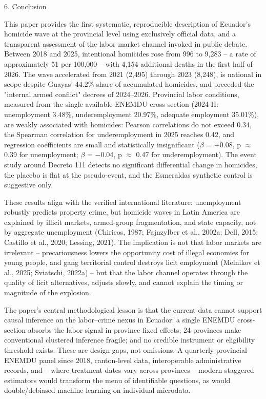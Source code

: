 6. Conclusion


This paper provides the first systematic, reproducible description of Ecuador's homicide wave at the provincial level using exclusively official data, and a transparent assessment of the labor market channel invoked in public debate. Between 2018 and 2025, intentional homicides rose from 996 to 9,283 -- a rate of approximately 51 per 100,000 -- with 4,154 additional deaths in the first half of 2026. The wave accelerated from 2021 (2,495) through 2023 (8,248), is national in scope despite Guayas' 44.2\% share of accumulated homicides, and preceded the "internal armed conflict" decrees of 2024--2026. Provincial labor conditions, measured from the single available ENEMDU cross-section (2024-II: unemployment 3.48\%, underemployment 20.97\%, adequate employment 35.01\%), are weakly associated with homicides: Pearson correlations do not exceed 0.34, the Spearman correlation for underemployment in 2025 reaches 0.42, and regression coefficients are small and statistically insignificant ($\beta$ = +0.08, p $\approx$ 0.39 for unemployment; $\beta$ = $-$0.04, p $\approx$ 0.47 for underemployment). The event study around Decreto 111 detects no significant differential change in homicides, the placebo is flat at the pseudo-event, and the Esmeraldas synthetic control is suggestive only.


These results align with the verified international literature: unemployment robustly predicts property crime, but homicide waves in Latin America are explained by illicit markets, armed-group fragmentation, and state capacity, not by aggregate unemployment (Chiricos, 1987; Fajnzylber et al., 2002a; Dell, 2015; Castillo et al., 2020; Lessing, 2021). The implication is not that labor markets are irrelevant -- precariousness lowers the opportunity cost of illegal economies for young people, and gang territorial control destroys licit employment (Melnikov et al., 2025; Sviatschi, 2022a) -- but that the labor channel operates through the quality of licit alternatives, adjusts slowly, and cannot explain the timing or magnitude of the explosion.


The paper's central methodological lesson is that the current data cannot support causal inference on the labor--crime nexus in Ecuador: a single ENEMDU cross-section absorbs the labor signal in province fixed effects; 24 provinces make conventional clustered inference fragile; and no credible instrument or eligibility threshold exists. These are design gaps, not omissions. A quarterly provincial ENEMDU panel since 2018, canton-level data, interoperable administrative records, and -- where treatment dates vary across provinces -- modern staggered estimators would transform the menu of identifiable questions, as would double/debiased machine learning on individual microdata.


